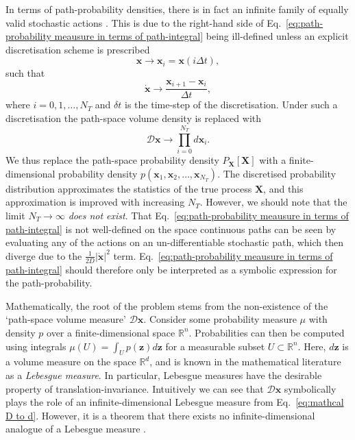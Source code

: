 In terms of path-probability densities, there is in fact an infinite family of equally valid stochastic actions \citep{gladrowExperimentalMeasurementRelative2021}. This is due to the right-hand side of Eq.~\ref{eq:path-probability meausure in terms of path-integral} being ill-defined unless an explicit discretisation scheme is prescribed
\begin{equation}
\mathbf{x} \longrightarrow \mathbf{x}_i = \mathbf{x}(i \Delta t),
\end{equation}
such that
\begin{equation}
\dot{\mathbf{x}} \longrightarrow \frac{\mathbf{x}_{i+1} - \mathbf{x}_i}{\Delta t},
\end{equation}
where $i=0, 1, \dots, N_T$ and $\delta t$ is the time-step of the discretisation. Under such a discretisation the path-space volume density is replaced with
\begin{equation} \label{eq:mathcal D to d}
\mathcal{D}\mathbf{x} \longrightarrow \prod_{i=0}^{N_T} d \mathbf{x}_i.
\end{equation}
We thus replace the path-space probability density $P_\mathbf{X}[\mathbf{X}]$ with a finite-dimensional probability density $p(\mathbf{x}_1, \mathbf{x}_2, \dots, \mathbf{x}_{N_T})$. The discretised probability distribution approximates the statistics of the true process $\mathbf{X}$, and this approximation is improved with increasing $N_T$. However, we should note that the limit $N_T \to \infty$ \textit{does not exist}. That Eq.~\ref{eq:path-probability meausure in terms of path-integral} is not well-defined on the space continuous paths can be seen by evaluating any of the actions on an un-differentiable stochastic path, which then diverge due to the $\frac{1}{2 D} |\dot{\mathbf{x}}|^2$ term. Eq.~\ref{eq:path-probability meausure in terms of path-integral} should therefore only be interpreted as a symbolic expression for the path-probability.

Mathematically, the root of the problem stems from the non-existence of the `path-space volume measure' $\mathcal{D} \mathbf{x}$. Consider some probability measure $\mu$ with density $p$ over a finite-dimensional space $\mathbb{R}^n$. Probabilities can then be computed using integrals $\mu(U) = \int_U p(\mathbf{z}) d \mathbf{z}$ for a measurable subset  $U \subset \mathbb{R}^n$. Here, $d \mathbf{z}$ is a volume measure on the space $\mathbb{R}^d$, and is known in the mathematical literature as a \textit{Lebesgue measure}. In particular, Lebesgue measures have the desirable property of translation-invariance. Intuitively we can see that $\mathcal{D} \mathbf{x}$ symbolically plays the role of an infinite-dimensional Lebesgue measure from Eq.~\ref{eq:mathcal D to d}. However, it is a theorem that there exists no infinite-dimensional analogue of a Lebesgue measure \citep{MeasureIntegrationTheory1972}. 

